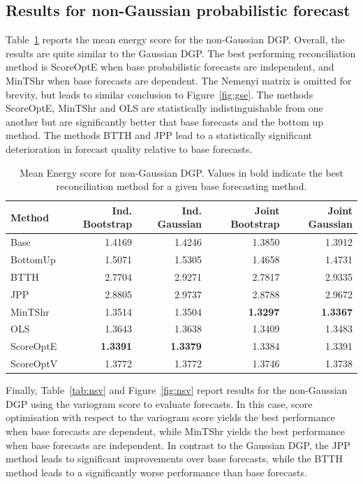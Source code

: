 \documentclass[12pt]{article}
\theoremstyle{definition}
\begin{document}
\subsection{Results for non-Gaussian probabilistic forecast} \label{sec:SimSamplingResults}

Table~\ref{tab:nse} reports the mean energy score for the non-Gaussian DGP.  Overall, the results are quite similar to the Gaussian DGP.  The best performing reconciliation method is ScoreOptE when base probabilistic forecasts are independent, and MinTShr when base forecasts are dependent.  The Nemenyi matrix is omitted for brevity, but leads to similar conclusion to Figure~\ref{fig:gse}. The methods ScoreOptE, MinTShr and OLS are statistically indistinguishable from one another but are significantly better that base forecasts and the bottom up method.  The methods BTTH and JPP lead to a statistically significant deterioration in forecast quality relative to base forecasts. 

\begin{table}[H]
	\footnotesize	
	\caption{\label{tab:nse} Mean Energy score for non-Gaussian DGP.  Values in bold indicate the best reconciliation method for a given base forecasting method.}
	\centering
	\begin{tabular}[t]{l|r|r|r|r}
		\hline
		Method & Ind. Bootstrap & Ind. Gaussian & Joint Bootstrap & Joint Gaussian\\
		\hline
		Base & 1.4169 & 1.4246 & 1.3850 & 1.3912\\
		\hline
		BottomUp & 1.5071 & 1.5305 & 1.4658 & 1.4731\\
		\hline
		BTTH & 2.7704 & 2.9271 & 2.7817 & 2.9335\\
		\hline
		JPP & 2.8805 & 2.9737 & 2.8788 & 2.9672\\
		\hline
		MinTShr & 1.3514 & 1.3504 & \textbf{1.3297} & \textbf{1.3367}\\
		\hline
		OLS & 1.3643 & 1.3638 & 1.3409 & 1.3483\\
		\hline
		ScoreOptE & \textbf{1.3391} & \textbf{1.3379} & 1.3384 & 1.3391\\
		\hline
		ScoreOptV & 1.3772 & 1.3772 & 1.3746 & 1.3738\\
		\hline
	\end{tabular}
\end{table}

Finally, Table~\ref{tab:nsv} and Figure~\ref{fig:nsv} report results for the non-Gaussian DGP using the variogram score to evaluate forecasts.  In this case, score optimisation with respect to the variogram score yields the best performance when base forecasts are dependent, while MinTShr yields the best performance when base forecasts are independent.  In contrast to the Gaussian DGP, the JPP method leads to significant improvements over base forecasts, while the BTTH method leads to a significantly worse performance than base forecasts.
\end{document}
